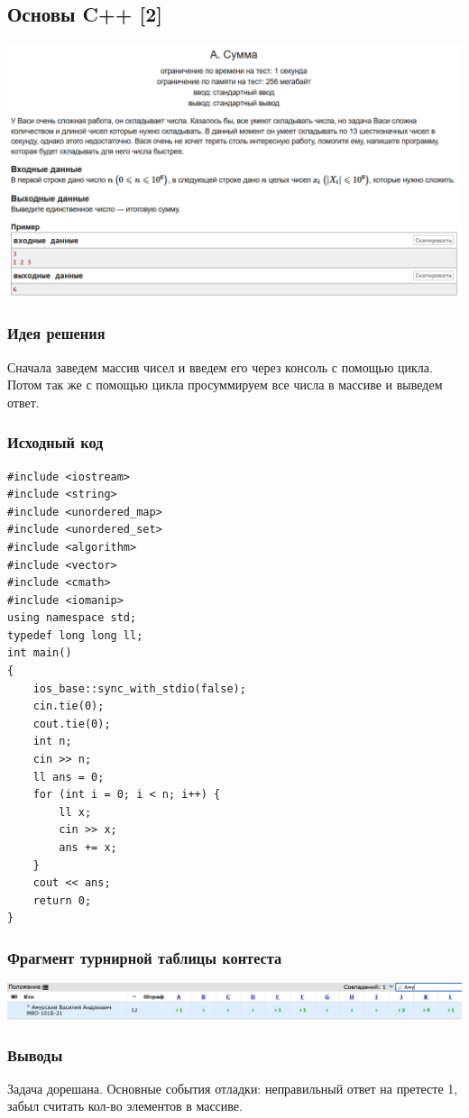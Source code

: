 \subsection*{Основы C++ [2]}
\begin{center}
\includegraphics[width=\textwidth]{2A.png}
\end{center}
\subsubsection*{Идея решения}
Сначала заведем массив чисел и введем его через консоль с помощью цикла. Потом так же с помощью цикла просуммируем все числа в массиве и выведем ответ.
\subsubsection*{Исходный код}
\begin{lstlisting}
#include <iostream>
#include <string>
#include <unordered_map>
#include <unordered_set>
#include <algorithm>
#include <vector>
#include <cmath>
#include <iomanip>
using namespace std;
typedef long long ll;
int main()
{
	ios_base::sync_with_stdio(false);
	cin.tie(0);
	cout.tie(0);
	int n;
	cin >> n;
	ll ans = 0;
	for (int i = 0; i < n; i++) {
		ll x;
		cin >> x;
		ans += x;
	}
	cout << ans;
	return 0;
}
\end{lstlisting}
\subsubsection*{Фрагмент турнирной таблицы контеста}
\begin{center}
\includegraphics[width=\textwidth]{state2.png}\newline\noindent
\end{center}

\subsubsection*{Выводы}
Задача дорешана. Основные события отладки: неправильный ответ на претесте 1, забыл считать кол-во элементов в массиве.
